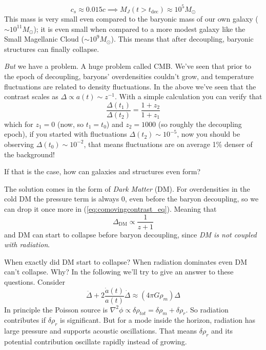 \begin{equation*}
    c_{s} \approx 0.015c \implies M_{J}(t > t_{\text{dec}}) \approx 10^{5}M_{\odot}
\end{equation*}
This mass is very small even compared to the baryonic mass of our own galaxy ($\sim 10^{11}M_{\odot}$); it is even small when compared to a more modest galaxy like the Small Magellanic Cloud ($\sim 10^{9}M_{\odot}$). This means that after decoupling, baryonic structures can finally collapse.
\par \emph{But} we have a problem. A huge problem called CMB. We've seen that prior to the epoch of decoupling, baryons’ overdensities couldn't grow, and temperature fluctuations are related to density fluctuations. In the above we've seen that the contrast scales as $\Delta \propto a(t) \sim z^{-1}$. With a simple calculation you can verify that
\begin{equation*}
    \frac{\Delta(t_{1})}{\Delta(t_{2})} = \frac{1+z_{2}}{1+z_{1}}
\end{equation*}
which for $z_{1} = 0$ (now, so $t_{1} = t_{0}$) and $z_{2} = 1000$ (so roughly the decoupling epoch), if you started with fluctuations $\Delta(t_{2})\sim 10^{-5}$, now you should be observing $\Delta(t_{0})\sim 10^{-2}$, that means fluctuations are on average 1\% denser of the background!
\par If that is the case, how can galaxies and structures even form?
\par The solution comes in the form of \emph{Dark Matter} (DM). For overdensities in the cold DM the pressure term is always 0, even before the baryon decoupling, so we can drop it once more in (\ref{eq:comovingcontrast_eq}). Meaning that
\begin{equation*}
    \Delta_{\text{DM}} \propto \frac{1}{z+1}
\end{equation*}
and DM can start to collapse before baryon decoupling, since \emph{DM is not coupled with radiation}.
\par When exactly did DM start to collapse? When radiation dominates even DM can’t collapse. Why? In the following we'll try to give an answer to these questions. Consider 
\begin{equation}
    \ddot{\Delta} + 2\frac{\dot{a}(t)}{a(t)}\dot{\Delta} \approx (4\pi G\rho_{m})\Delta
    \label{eq:dm_evolution}
\end{equation}
In principle the Poisson source is $\nabla^{2}\phi \propto \delta\rho_{tot}= \delta\rho_{m}+\delta\rho_{r}$. So radiation contributes if $\delta\rho_{r}$ is significant. But for a mode inside the horizon, radiation has large pressure and supports acoustic oscillations. That means $\delta\rho_{r}$ and its potential contribution oscillate rapidly instead of growing.
